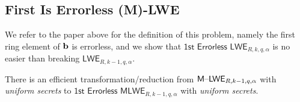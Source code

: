 \documentclass[oribibl,envcountsect,envcountsame]{llncs}
\begin{document}
\subsection{First Is Errorless (M)-LWE}
\label{sec:first-errorless-m-lwe}

We refer to the paper above for the definition of this problem, namely the first ring element of 
$\mathbf{b}$ is errorless, and we show that $\textsf{1st Errorless LWE}_{R,k,q,\alpha}$ is no easier than breaking 
$\textsf{LWE}_{R,k-1,q,\alpha}$.

\begin{lemma}
There is an efficient transformation/reduction from $\mathsf{M \text{\textendash} LWE}_{R,k-1,q,\alpha}$ with \textit{uniform 
secrets} to $\textsf{1st Errorless MLWE}_{R,k-1,q,\alpha}$ with \textit{uniform secrets}. 
\end{lemma}
\end{document}
